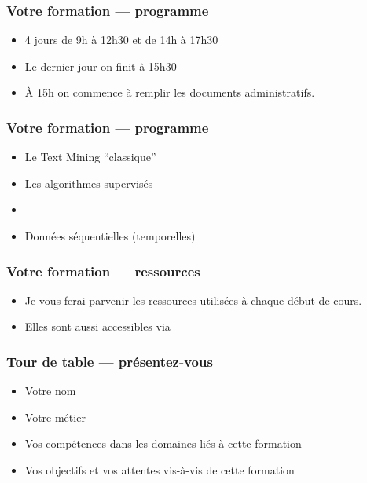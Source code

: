 \begin{frame}
  \frametitle{Votre formation — programme}
  \begin{itemize}
  \item 4 jours de 9h à 12h30 et de 14h à 17h30
  \item Le dernier jour on finit à 15h30
  \item À 15h on commence à remplir les documents administratifs.
  \end{itemize}
\end{frame}

\begin{frame}
  \frametitle{Votre formation — programme}
  \begin{itemize}
  \item Le Text Mining ``classique''
  \item Les algorithmes supervisés
  \item 
  \item Données séquentielles (temporelles)
  \end{itemize}
\end{frame}

\begin{frame}
  \frametitle{Votre formation — ressources}
  \begin{itemize}
  \item Je vous ferai parvenir les ressources utilisées à chaque début de cours.
  \item Elles sont aussi accessibles via 
  \end{itemize}
\end{frame}

\begin{frame}
  \frametitle{Tour de table — présentez-vous}
  \begin{itemize}
  \item Votre nom
  \item Votre métier
  \item Vos compétences dans les domaines liés à cette formation
  \item Vos objectifs et vos attentes vis-à-vis de cette formation
  \end{itemize}
\end{frame}

